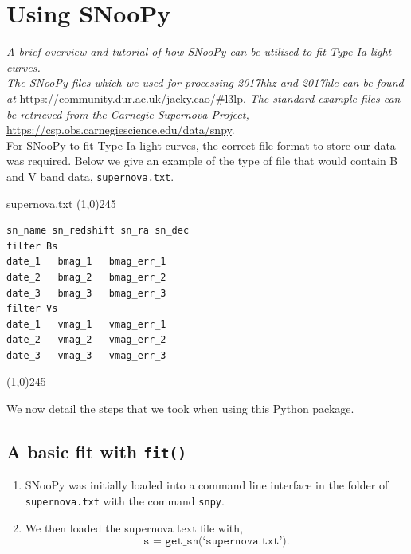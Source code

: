 \documentclass[twocolumn]{revtex4}
\begin{document}
{{{{{\clearpage

\twocolumngrid
\vspace{-3ex}
\section{Using SNooPy} \label{app:using_snoopy}
\vspace{-2ex}
\textit{A brief overview and tutorial of how SNooPy can be utilised to fit Type Ia light curves.} \\

\textit{The SNooPy files which we used for processing 2017hhz and 2017hle can be found at} \url{https://community.dur.ac.uk/jacky.cao/#l3lp}. \textit{The standard example files can be retrieved from the Carnegie Supernova Project,} \url{https://csp.obs.carnegiescience.edu/data/snpy}. \\

For SNooPy to fit Type Ia light curves, the correct file format to store our data was required. Below we give an example of the type of file that would contain B and V band data, \texttt{supernova.txt}.
\begin{center}
supernova.txt
\line(1,0){245}
\vspace{-4ex}
\end{center}
\begin{lstlisting}
sn_name sn_redshift sn_ra sn_dec
filter Bs
date_1   bmag_1   bmag_err_1
date_2   bmag_2   bmag_err_2
date_3   bmag_3   bmag_err_3
filter Vs
date_1   vmag_1   vmag_err_1
date_2   vmag_2   vmag_err_2
date_3   vmag_3   vmag_err_3
\end{lstlisting}
\begin{center}
\vspace{-7ex}
\line(1,0){245}
\end{center}

We now detail the steps that we took when using this Python package.

\subsection{A basic fit with \texttt{fit()}}
\begin{enumerate}
 \item SNooPy was initially loaded into a command line interface in the folder of \texttt{supernova.txt} with the command \texttt{snpy}.
 \item We then loaded the supernova text file with,
 \begin{equation*}
 \texttt{s = get\_sn(`supernova.txt')} .
 \end{equation*}
 

\end{enumerate}}}}}}
\end{document}
